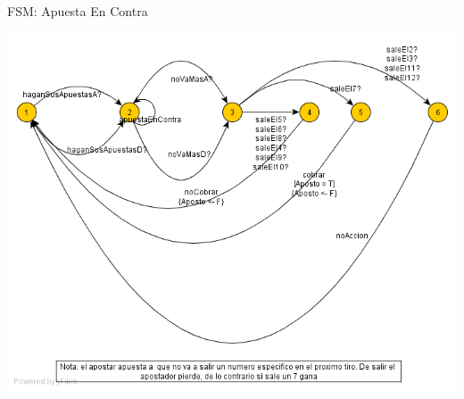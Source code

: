 {\large FSM: Apuesta En Contra}
\begin{center}
\includegraphics[scale=0.5]{img/apuestaEnContra.png}
\end{center}

